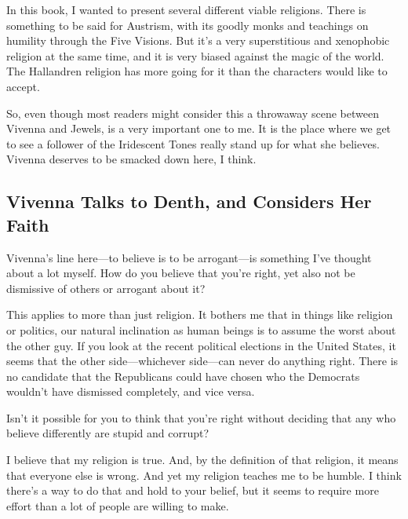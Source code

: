 In this book, I wanted to present several different viable religions. There is something to be said for Austrism, with its goodly monks and teachings on humility through the Five Visions. But it’s a very superstitious and xenophobic religion at the same time, and it is very biased against the magic of the world. The Hallandren religion has more going for it than the characters would like to accept.

So, even though most readers might consider this a throwaway scene between Vivenna and Jewels, is a very important one to me. It is the place where we get to see a follower of the Iridescent Tones really stand up for what she believes. Vivenna deserves to be smacked down here, I think.

\subsection*{Vivenna Talks to Denth, and Considers Her Faith}

Vivenna’s line here—to believe is to be arrogant—is something I’ve thought about a lot myself. How do you believe that you’re right, yet also not be dismissive of others or arrogant about it?

This applies to more than just religion. It bothers me that in things like religion or politics, our natural inclination as human beings is to assume the worst about the other guy. If you look at the recent political elections in the United States, it seems that the other side—whichever side—can never do anything right. There is no candidate that the Republicans could have chosen who the Democrats wouldn’t have dismissed completely, and vice versa.

Isn’t it possible for you to think that you’re right without deciding that any who believe differently are stupid and corrupt?

I believe that my religion is true. And, by the definition of that religion, it means that everyone else is wrong. And yet my religion teaches me to be humble. I think there’s a way to do that and hold to your belief, but it seems to require more effort than a lot of people are willing to make.




